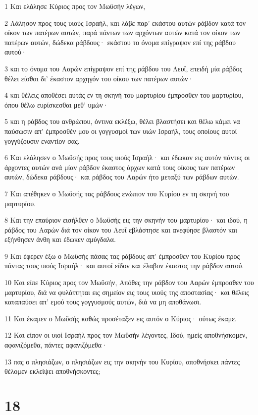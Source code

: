 \par 1 Και ελάλησε Κύριος προς τον Μωϋσήν λέγων,
\par 2 Λάλησον προς τους υιούς Ισραήλ, και λάβε παρ' εκάστου αυτών ράβδον κατά τον οίκον των πατέρων αυτών, παρά πάντων των αρχόντων αυτών κατά τον οίκον των πατέρων αυτών, δώδεκα ράβδους· εκάστου το όνομα επίγραψον επί της ράβδου αυτού·
\par 3 και το όνομα του Ααρών επίγραψον επί της ράβδου του Λευΐ, επειδή μία ράβδος θέλει είσθαι δι' έκαστον αρχηγόν του οίκου των πατέρων αυτών·
\par 4 και θέλεις αποθέσει αυτάς εν τη σκηνή του μαρτυρίου έμπροσθεν του μαρτυρίου, όπου θέλω ευρίσκεσθαι μεθ' υμών·
\par 5 και η ράβδος του ανθρώπου, όντινα εκλέξω, θέλει βλαστήσει και θέλω κάμει να παύσωσιν απ' έμπροσθέν μου οι γογγυσμοί των υιών Ισραήλ, τους οποίους αυτοί γογγύζουσιν εναντίον σας.
\par 6 Και ελάλησεν ο Μωϋσής προς τους υιούς Ισραήλ· και έδωκαν εις αυτόν πάντες οι άρχοντες αυτών ανά μίαν ράβδον έκαστος άρχων κατά τους οίκους των πατέρων αυτών, δώδεκα ράβδους· και ράβδος του Ααρών ήτο μεταξύ των ράβδων αυτών.
\par 7 Και απέθηκεν ο Μωϋσής τας ράβδους ενώπιον του Κυρίου εν τη σκηνή του μαρτυρίου.
\par 8 Και την επαύριον εισήλθεν ο Μωϋσής εις την σκηνήν του μαρτυρίου· και ιδού, η ράβδος του Ααρών διά τον οίκον του Λευΐ εβλάστησε και ανεφύησε βλαστόν και εξήνθησεν άνθη και έδωκεν αμύγδαλα.
\par 9 Και έφερεν έξω ο Μωϋσής πάσας τας ράβδους απ' έμπροσθεν του Κυρίου προς πάντας τους υιούς Ισραήλ· και αυτοί είδον και έλαβον έκαστος την ράβδον αυτού.
\par 10 Και είπε Κύριος προς τον Μωϋσήν, Απόθες την ράβδον του Ααρών έμπροσθεν του μαρτυρίου, διά να φυλάττηται εις σημείον εις τους υιούς της αποστασίας· και θέλεις καταπαύσει απ' εμού τους γογγυσμούς αυτών, διά να μη αποθάνωσι.
\par 11 Και έκαμεν ο Μωϋσής καθώς προσέταξεν εις αυτόν ο Κύριος· ούτως έκαμε.
\par 12 Και είπον οι υιοί Ισραήλ προς τον Μωϋσήν λέγοντες, Ιδού, ημείς αποθνήσκομεν, αφανιζόμεθα, πάντες αφανιζόμεθα·
\par 13 πας ο πλησιάζων, ο πλησιάζων εις την σκηνήν του Κυρίου, αποθνήσκει πάντες θέλομεν εκλείψει αποθνήσκοντες;

\chapter{18}

